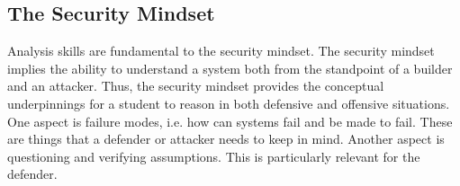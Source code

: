 \subsection{The Security Mindset}

Analysis skills are fundamental to the security mindset.  The security
mindset implies the ability to understand a system both from the
standpoint of a builder and an attacker.  Thus, the security mindset
provides the conceptual underpinnings for a student to reason in both
defensive and offensive situations.  One aspect is failure modes,
i.e. how can systems fail and be made to fail.  These are things that
a defender or attacker needs to keep in mind.  Another aspect is
questioning and verifying assumptions.  This is particularly relevant
for the defender.
